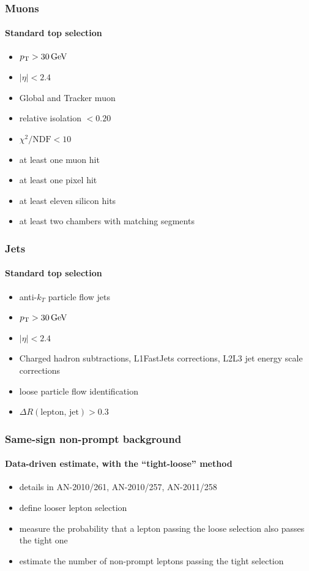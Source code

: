 \documentclass[ukenglish]{beamer}
\begin{document}
\begin{frame}
    \frametitle{Muons}
    \framesubtitle{Standard top selection}
    \begin{itemize}
        \item $\pt > \unit[30]{GeV}$
        \item $|\eta| < 2.4$
        \item Global and Tracker muon
        \item relative isolation $< 0.20$
        \item $\chi^2/\text{NDF} < 10$
        \item at least one muon hit
        \item at least one pixel hit
        \item at least eleven silicon hits
        \item at least two chambers with matching segments
    \end{itemize}
\end{frame}

\begin{frame}
    \frametitle{Jets}
    \framesubtitle{Standard top selection}
    \begin{itemize}
        \item anti-$k_T$ particle flow jets
        \item $\pt > \unit[30]{GeV}$
        \item $|\eta| < 2.4$
        \item Charged hadron subtractions, L1FastJets corrections,
            L2L3 jet energy scale corrections
        \item loose particle flow identification
        \item $\Delta R(\text{lepton, jet}) > 0.3$
    \end{itemize}
\end{frame}

\begin{frame}
    \frametitle{Same-sign non-prompt background}
    \framesubtitle{Data-driven estimate, with the ``tight-loose'' method}
    \begin{itemize}
        \item details in AN-2010/261, AN-2010/257, AN-2011/258
        \item define looser lepton selection
        \item measure the probability that a lepton passing the loose
            selection also passes the tight one
        \item estimate the number of non-prompt leptons passing the tight
            selection
    \end{itemize}
\end{frame}
\end{document}
